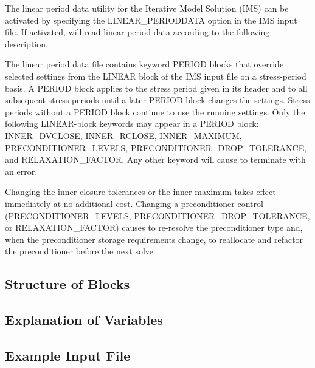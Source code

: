 The linear period data utility for the Iterative Model Solution (IMS) can be activated by specifying the LINEAR\_PERIODDATA option in the IMS input file.  If activated, \mf will read linear period data according to the following description.

The linear period data file contains keyword PERIOD blocks that override selected settings from the LINEAR block of the IMS input file on a stress-period basis.  A PERIOD block applies to the stress period given in its header and to all subsequent stress periods until a later PERIOD block changes the settings.  Stress periods without a PERIOD block continue to use the running settings.  Only the following LINEAR-block keywords may appear in a PERIOD block: INNER\_DVCLOSE, INNER\_RCLOSE, INNER\_MAXIMUM, PRECONDITIONER\_LEVELS, PRECONDITIONER\_DROP\_TOLERANCE, and RELAXATION\_FACTOR.  Any other keyword will cause \mf to terminate with an error.

Changing the inner closure tolerances or the inner maximum takes effect immediately at no additional cost.  Changing a preconditioner control (PRECONDITIONER\_LEVELS, PRECONDITIONER\_DROP\_TOLERANCE, or RELAXATION\_FACTOR) causes \mf to re-resolve the preconditioner type and, when the preconditioner storage requirements change, to reallocate and refactor the preconditioner before the next solve.

\vspace{5mm}
\subsection{Structure of Blocks}


\vspace{5mm}
\subsection{Explanation of Variables}
\begin{description}

\end{description}

\vspace{5mm}
\subsection{Example Input File}

